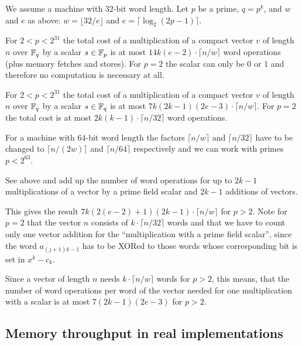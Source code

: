 \begin{Prop}
\label{multvec}
We assume a machine with $32$-bit word length.
Let $p$ be a prime, $q = p^k$, and $w$ and $e$ as above:
$w = \lfloor 32/e \rfloor$ and $e = \lceil \log_2(2p-1) \rceil$.

For\/ $2 < p < 2^{31}$ the total cost of a multiplication of a compact 
vector $v$ of length $n$ over $\mathbb{F}_q$ by a scalar $s \in \mathbb{F}_p$ is at most 
$14k(e-2)\cdot \lceil n/w \rceil$ word operations (plus memory fetches
and stores). For $p=2$ the scalar
can only be $0$ or $1$ and therefore no computation is necessary at all.

For\/ $2 < p < 2^{31}$ the total cost of a multiplication of a compact
vector $v$ of length $n$ over $\mathbb{F}_q$ by a scalar $s \in \mathbb{F}_q$ is at most
$7k(2k-1)(2e-3)\cdot \lceil n/w \rceil$. For $p = 2$ the total cost is
at most $2k(k-1) \cdot \lceil n/32 \rceil$ word operations.

For a machine with $64$-bit word length the factors $\lceil n/w \rceil$
and $\lceil n/32 \rceil$ have to be changed to $\lceil n/(2w) \rceil$
and $\lceil n/64 \rceil$ respectively
and we can work with primes $p < 2^{63}$.
\end{Prop}

\Proof See above and add up the number of word operations for up
to $2k-1$ multiplications of a vector by a prime field scalar and $2k-1$
additions of vectors. 

This gives the result $7k(2(e-2)+1)(2k-1)\cdot
\lceil n/w \rceil$ for $p > 2$. Note for $p=2$ that the vector $n$ consists of
$k \cdot \lceil n/32 \rceil$ words and that we have to count only one
vector addition for the ``multiplication with a prime field scalar'', since 
the word $a_{(j+1)k-1}$ has to be XORed to those words whose corresponding
bit is set in $x^k - c_k$.
\ProofEnd

\begin{Rem}
Since a vector of length $n$ needs $k \cdot \lceil n/w \rceil$ words
for $p > 2$, this means, that the number of word operations per word of
the vector needed for one multiplication with a scalar is at most 
$7(2k-1)(2e-3)$ for $p > 2$.
\end{Rem}

\subsection{Memory throughput in real implementations}

